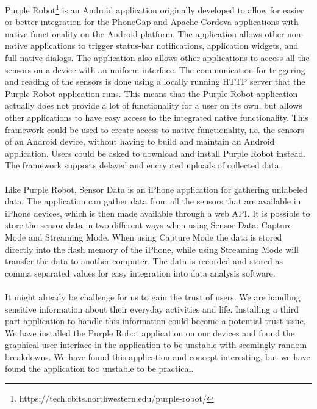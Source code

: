 Purple Robot\footnote{https://tech.cbits.northwestern.edu/purple-robot/} is an Android application originally developed to allow for easier or better integration for the PhoneGap and Apache Cordova applications with native functionality on the Android platform. The application allows other non-native applications to trigger status-bar notifications, application widgets, and full native dialogs. The application also allows other applications to access all the sensors on a device with an uniform interface. 
The communication for triggering and reading of the sensors is done using a locally running HTTP server that the Purple Robot application runs. This means that the Purple Robot application actually does not provide a lot of functionality for a user on its own, but allows other applications to have easy access to the integrated native functionality.
This framework could be used to create access to native functionality, i.e. the sensors of an Android device, without having to build and maintain an Android application. Users could be asked to download and install Purple Robot instead. The framework supports delayed and encrypted uploads of collected data. 
\\\\
Like Purple Robot, Sensor Data is an iPhone application for gathering unlabeled data. The application can gather data from all the sensors that are available in iPhone devices, which is then made available through a web API. It is possible to store the sensor data in two different ways when using Sensor Data: Capture Mode and Streaming Mode. When using Capture Mode the data is stored directly into the flash memory of the iPhone, while using Streaming Mode will transfer the data to another computer. The data is recorded and stored as comma separated values for easy integration into data analysis software.
\\\\
It might already be challenge for us to gain the trust of users. We are handling sensitive information about their everyday activities and life. 
Installing a third part application to handle this information could become a potential trust issue. We have installed the Purple Robot application on our devices and found the graphical user interface in the application to be unstable with seemingly random breakdowns. We have found this application and concept interesting, but we have found the application too unstable to be practical.   

